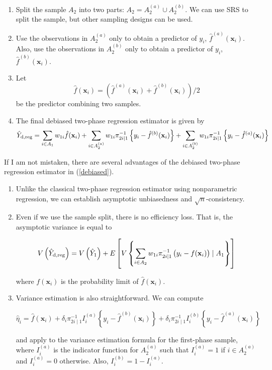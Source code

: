 \documentclass[12pt]{article}
\newcommand{\bx}{\mathbf{x}}
\begin{document}
\begin{enumerate}
\item Split the sample $A_2$ into two parts: $A_2= A_2^{(a)} \cup A_2^{(b)}$.
  We can use SRS to split the sample, but other sampling designs can be used. 

\item Use the observations in $A_2^{(a)}$ only to obtain a predictor of $y_i$,
  $\hat{f}^{(a)} (\bx_i)$. Also, use the observations in $A_2^{(b)}$ only to
  obtain a predictor of $y_i$, $\hat{f}^{(b)} (\bx_i)$. 

\item Let 
$$ \hat{f}(\bx_i) = \left( \hat{f}^{(a)} (\bx_i) + \hat{f}^{(b)} (\bx_i) \right)/ 2$$
be the predictor combining two samples. 

\item The final debiased two-phase regression estimator is given by 
\begin{equation}
\hat{Y}_{\rm d, reg} = \sum_{i \in A_1} w_{1i}  \hat{f}(\bx_i) +  
\sum_{i \in A_2^{(a)} } w_{1i} \pi_{2i \mid 1}^{-1} \left\{y_i - \hat{f}^{(b)} (\bx_i) \right\} +
\sum_{i \in A_2^{(b)} } w_{1i} \pi_{2i \mid 1}^{-1} \left\{y_i - \hat{f}^{(a)} (\bx_i) \right\}
\label{debiased}
\end{equation}
\end{enumerate}

 If I am not mistaken, there are several advantages of the debiased two-phase
 regression estimator in (\ref{debiased}). 

\begin{enumerate}
\item Unlike the classical two-phase regression estimator using nonparametric
  regression, we can establish asymptotic unbiasedness and
  $\sqrt{n}$-consistency. 
\item Even if we use the sample split, there is no efficiency loss. That is, the
  asymptotic variance is equal to 

$$ V \left( \hat{Y}_{\rm d, reg} \right) = V \left( \hat{Y}_1 \right) + E\left[
V \left\{ \sum_{i \in A_2} w_{1i} \pi_{2i \mid 1}^{-1} \left( y_i - f(\bx_i)
\right) \mid A_1 \right\} \right] 
$$

where $f(\bx_i)$ is the probability limit of $\hat{f}(\bx_i)$. 

\item Variance estimation is also straightforward. We can compute 

$$ \hat{\eta}_i = \hat{f}(\bx_i) +\delta_i  \pi_{2i \mid 1}^{-1} I_i^{(a)}
\left\{ y_i - \hat{f}^{(b)}(\bx_i) \right\} +\delta_i \pi_{2i \mid 1}^{-1}
I_i^{(b)} \left\{ y_i - \hat{f}^{(a)} (\bx_i) \right\}$$

and apply to the variance estimation formula for the first-phase sample, 
where $I_i^{(a)}$ is the indicator function for $A_2^{(a)}$ such that $I_i^{(a)}
= 1$ if $i \in A_2^{(a)}$ and $I_i^{(a)}=0$ otherwise. Also, $I_i^{(b)}= 1-
I_i^{(a)}$. 
\end{enumerate}
\end{document}

